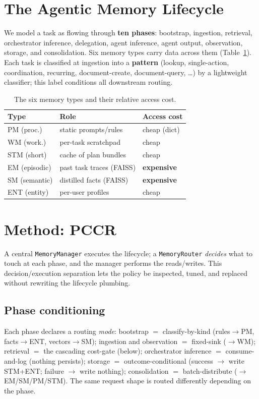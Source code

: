 \documentclass[10pt,twocolumn]{article}
\begin{document}
\section{The Agentic Memory Lifecycle}
We model a task as flowing through \textbf{ten phases}: bootstrap, ingestion,
retrieval, orchestrator inference, delegation, agent inference, agent output,
observation, storage, and consolidation. Six memory types carry data across
them (Table~\ref{tab:types}). Each task is classified at ingestion into a
\textbf{pattern} (lookup, single-action, coordination, recurring,
document-create, document-query, \ldots) by a lightweight classifier; this label
conditions all downstream routing.

\begin{table}[t]
\centering\small
\begin{tabular}{@{}lll@{}}
\toprule
Type & Role & Access cost \\
\midrule
PM (proc.)   & static prompts/rules        & cheap (dict) \\
WM (work.)   & per-task scratchpad          & cheap \\
STM (short)  & cache of plan bundles        & cheap \\
EM (episodic)& past task traces (FAISS)     & \textbf{expensive} \\
SM (semantic)& distilled facts (FAISS)      & \textbf{expensive} \\
ENT (entity) & per-user profiles            & cheap \\
\bottomrule
\end{tabular}
\caption{The six memory types and their relative access cost.}
\label{tab:types}
\end{table}

\section{Method: PCCR}
A central \texttt{MemoryManager} executes the lifecycle; a \texttt{MemoryRouter}
\emph{decides} what to touch at each phase, and the manager performs the
reads/writes. This decision/execution separation lets the policy be inspected,
tuned, and replaced without rewriting the lifecycle plumbing.

\subsection{Phase conditioning}\label{sec:phase}
Each phase declares a routing \emph{mode}: bootstrap $=$ classify-by-kind
(rules$\rightarrow$PM, facts$\rightarrow$ENT, vectors$\rightarrow$SM); ingestion
and observation $=$ fixed-sink ($\rightarrow$WM); retrieval $=$ the cascading
cost-gate (below); orchestrator inference $=$ consume-and-log (nothing persists);
storage $=$ outcome-conditional (success $\rightarrow$ write STM+ENT; failure
$\rightarrow$ write nothing); consolidation $=$ batch-distribute
($\rightarrow$EM/SM/PM/STM). The same request shape is routed differently
depending on the phase.
\end{document}

